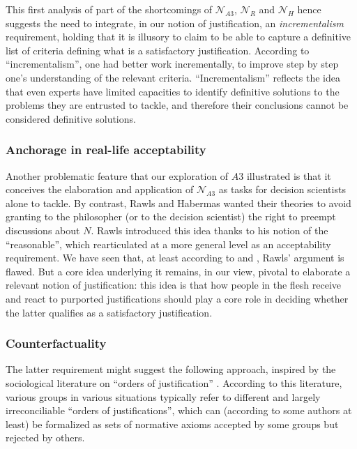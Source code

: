 \documentclass[preprint, french, english, 11pt, authoryear]{elsarticle}%
\begin{document}
This first analysis of part of the shortcomings of $\mathscr{N}_{A3}$, $\mathscr{N}_{R}$ and $\mathscr{N}_{H}$ hence suggests the need to integrate, in our notion of justification, an \emph{incrementalism} requirement, holding that it is illusory to claim to be able to capture a definitive list of criteria defining what is a satisfactory justification. According to “incrementalism”, one had better work incrementally, to improve step by step one's understanding of the relevant criteria. “Incrementalism” reflects the idea that even experts have limited capacities to identify definitive solutions to the problems they are entrusted to tackle, and therefore their conclusions cannot be considered definitive solutions.

\subsubsection{Anchorage in real-life acceptability}
Another problematic feature that our exploration of $A3$ illustrated is that it conceives the elaboration and application of $\mathscr{N}_{A3}$ as tasks for decision scientists alone to tackle. By contrast, Rawls and Habermas wanted their theories to avoid granting to the philosopher (or to the decision scientist) the right to preempt discussions about $N$. Rawls introduced this idea thanks to his notion of the ``reasonable'', which \cite{estlund_democratic_2009} rearticulated at a more general level as an acceptability requirement. We have seen that, at least according to \cite{habermas_reconciliation_1995} and \cite{estlund_democratic_2009}, Rawls' argument is flawed. But a core idea underlying it remains, in our view, pivotal to elaborate a relevant notion of justification: this idea is that how people in the flesh receive and react to purported justifications should play a core role in deciding whether the latter qualifies as a satisfactory justification.

\subsubsection{Counterfactuality}
The latter requirement might suggest the following approach, inspired by the sociological literature on “orders of justification” \citep{boltanski_justification_2006}. According to this literature, various groups in various situations typically refer to different and largely irreconciliable “orders of justifications”, which can (according to some authors at least) be formalized as sets of normative axioms accepted by some groups but rejected by others.
\end{document}
